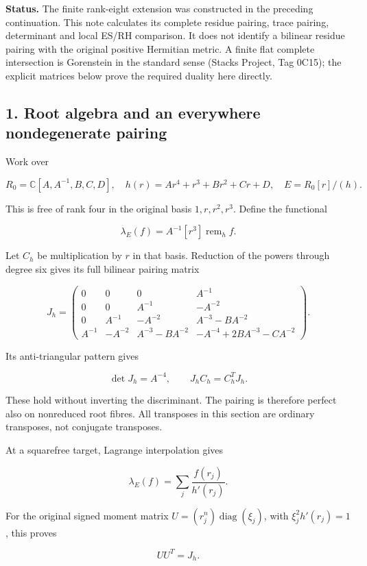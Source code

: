 \textbf{Status.} The finite rank-eight extension was constructed in the
preceding continuation. This note calculates its complete residue
pairing, trace pairing, determinant and local ES/RH comparison. It does
not identify a bilinear residue pairing with the original positive
Hermitian metric. A finite flat complete intersection is Gorenstein in
the standard sense (Stacks Project, Tag 0C15); the explicit matrices
below prove the required duality here directly.

\subsection{1. Root algebra and an everywhere nondegenerate
pairing}\label{root-algebra-and-an-everywhere-nondegenerate-pairing}

Work over

\[
 R_0=\mathbb C[A,A^{-1},B,C,D],\quad
 h(r)=Ar^4+r^3+Br^2+Cr+D,\quad E=R_0[r]/(h).
\]

This is free of rank four in the original basis \(1,r,r^2,r^3\). Define
the functional

\[
 \lambda_E(f)=A^{-1}[r^3]\operatorname{rem}_h f.
\]

Let \(C_h\) be multiplication by \(r\) in that basis. Reduction of the
powers through degree six gives its full bilinear pairing matrix

\[
 J_h=\begin{pmatrix}
0&0&0&A^{-1}\\
0&0&A^{-1}&-A^{-2}\\
0&A^{-1}&-A^{-2}&A^{-3}-BA^{-2}\\
A^{-1}&-A^{-2}&A^{-3}-BA^{-2}&-A^{-4}+2BA^{-3}-CA^{-2}
\end{pmatrix}.
\]

Its anti-triangular pattern gives

\[
 \boxed{\det J_h=A^{-4},\qquad J_h C_h=C_h^T J_h.}
\]

These hold without inverting the discriminant. The pairing is therefore
perfect also on nonreduced root fibres. All transposes in this section
are ordinary transposes, not conjugate transposes.

At a squarefree target, Lagrange interpolation gives

\[
 \lambda_E(f)=\sum_j\frac{f(r_j)}{h'(r_j)}.
\]

For the original signed moment matrix
\(U=(r_j^n)\operatorname{diag}(\xi_j)\), with \(\xi_j^2h'(r_j)=1\), this
proves

\[
 \boxed{UU^T=J_h.}
\]

